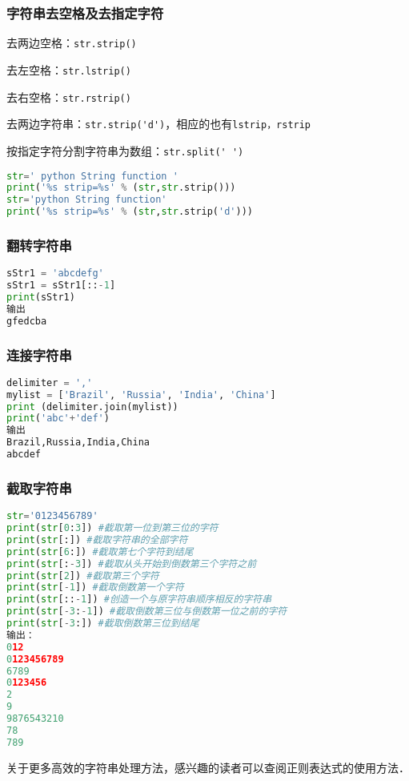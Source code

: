 \subsubsection{字符串去空格及去指定字符}

去两边空格：\verb|str.strip()|

去左空格：\verb|str.lstrip()|

去右空格：\verb|str.rstrip()|

去两边字符串：\verb|str.strip('d')|，相应的也有\verb|lstrip，rstrip|

按指定字符分割字符串为数组：\verb|str.split(' ')|

\begin{lstlisting}[language=python]
str=' python String function '
print('%s strip=%s' % (str,str.strip()))
str='python String function'
print('%s strip=%s' % (str,str.strip('d')))
\end{lstlisting}



\subsubsection{翻转字符串}
\begin{lstlisting}[language=python]
sStr1 = 'abcdefg'
sStr1 = sStr1[::-1]
print(sStr1)
输出
gfedcba
\end{lstlisting}

\subsubsection{连接字符串}
\begin{lstlisting}[language=python]
delimiter = ','
mylist = ['Brazil', 'Russia', 'India', 'China']
print (delimiter.join(mylist))
print('abc'+'def')
输出
Brazil,Russia,India,China
abcdef
\end{lstlisting}

\subsubsection{截取字符串}
\begin{lstlisting}[language=python]
str='0123456789'
print(str[0:3]) #截取第一位到第三位的字符
print(str[:]) #截取字符串的全部字符
print(str[6:]) #截取第七个字符到结尾
print(str[:-3]) #截取从头开始到倒数第三个字符之前
print(str[2]) #截取第三个字符
print(str[-1]) #截取倒数第一个字符
print(str[::-1]) #创造一个与原字符串顺序相反的字符串
print(str[-3:-1]) #截取倒数第三位与倒数第一位之前的字符
print(str[-3:]) #截取倒数第三位到结尾
输出：
012
0123456789
6789
0123456
2
9
9876543210
78
789
\end{lstlisting}


关于更多高效的字符串处理方法，感兴趣的读者可以查阅正则表达式的使用方法．
